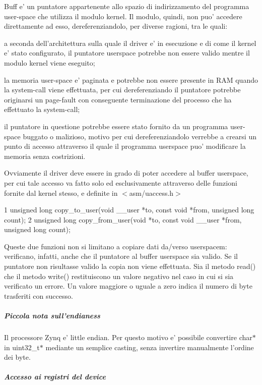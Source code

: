 Buff e' un puntatore appartenente allo spazio di indirizzamento del programma user-\/space che utilizza il modulo kernel. Il modulo, quindi, non puo' accedere direttamente ad esso, dereferenziandolo, per diverse ragioni, tra le quali\+:
\begin{DoxyItemize}
\item a seconda dell'architettura sulla quale il driver e' in esecuzione e di come il kernel e' stato configurato, il puntatore userspace potrebbe non essere valido mentre il modulo kernel viene eseguito;
\item la memoria user-\/space e' paginata e potrebbe non essere presente in R\+A\+M quando la system-\/call viene effettuata, per cui dereferenziando il puntatore potrebbe originarsi un page-\/fault con conseguente terminazione del processo che ha effettuato la system-\/call;
\item il puntatore in questione potrebbe essere stato fornito da un programma user-\/space buggato o malizioso, motivo per cui dereferenziandolo verrebbe a crearsi un punto di accesso attraverso il quale il programma userspace puo' modificare la memoria senza costrizioni.
\end{DoxyItemize}

Ovviamente il driver deve essere in grado di poter accedere al buffer userspace, per cui tale accesso va fatto solo ed esclusivamente attraverso delle funzioni fornite dal kernel stesso, e definite in $<$asm/uaccess.\+h$>$ 
\begin{DoxyCode}
1 unsigned long copy\_to\_user(void \_\_user *to, const void *from, unsigned long count);
2 unsigned long copy\_from\_user(void *to, const void \_\_user *from, unsigned long count);
\end{DoxyCode}
 Queste due funzioni non si limitano a copiare dati da/verso userspacem\+: verificano, infatti, anche che il puntatore al buffer userspace sia valido. Se il puntatore non risultasse valido la copia non viene effettuata. Sia il metodo read() che il metodo write() restituiscono un valore negativo nel caso in cui si sia verificato un errore. Un valore maggiore o uguale a zero indica il numero di byte trasferiti con successo.

\subparagraph*{Piccola nota sull'endianess}

Il processore Zynq e' little endian. Per questo motivo e' possibile convertire char$\ast$ in uint32\+\_\+t$\ast$ mediante un semplice casting, senza invertire manualmente l'ordine dei byte.

\subparagraph*{Accesso ai registri del device}

